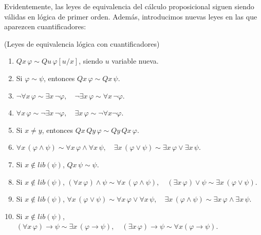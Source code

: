 Evidentemente, las leyes de equivalencia del cálculo proposicional siguen siendo válidas en lógica de primer orden. Además, introducimos nuevas leyes en las que aparezcen cuantificadores:

\begin{theorem}(Leyes de equivalencia lógica con cuantificadores)\mbox{}
\begin{enumerate}
    \item $Q x \, \varphi \sim Q u \, \varphi[u/x]$, siendo $u$ variable nueva.
    \item Si $\varphi \sim \psi$, entonces $Qx \, \varphi \sim Qx \, \psi$.
    \item $\neg \forall x \, \varphi \sim \exists x \, \neg \varphi,  \quad \neg \exists x \, \varphi \sim \forall x \, \neg \varphi$.
    \item $\forall x \, \varphi \sim \neg \exists x \, \neg \varphi, \quad \exists x \, \varphi \sim \neg \forall x \neg \varphi$.
    \item Si $x \neq y$, entonces $Qx \, Qy \, \varphi \sim Qy \, Qx \, \varphi$.
    \item $\forall x \, (\varphi \land \psi) \sim \forall x \, \varphi \land \forall x\, \psi, \quad \exists x \, (\varphi \lor \psi) \sim \exists x \, \varphi \lor \exists x\, \psi$.
    \item Si $x \notin lib(\psi)$, $Qx \, \psi \sim \psi$.
    \item Si $x \notin lib(\psi)$, $(\forall x \, \varphi) \land \psi \sim \forall x \, (\varphi \land \psi), \quad  (\exists x \, \varphi) \lor \psi \sim \exists x \, (\varphi \lor \psi)$.
    \item Si $x \notin lib(\psi)$, $\forall x \, (\varphi \lor \psi) \sim \forall x \, \varphi \lor \forall x \, \psi, \quad \exists x \, (\varphi \land \psi) \sim \exists x \, \varphi \land \exists x \, \psi$.
    \item Si $x \notin lib(\psi)$, $(\forall x \, \varphi) \rightarrow \psi \sim \exists x \, (\varphi \rightarrow  \psi), \quad (\exists x \, \varphi) \rightarrow \psi \sim \forall x (\varphi \rightarrow  \psi)$.
\end{enumerate}
\end{theorem}
